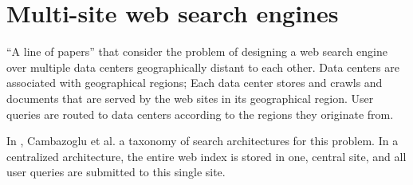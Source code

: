 



\section{Multi-site web search engines}
``A line of papers'' that consider the problem of designing a web search engine over multiple data centers geographically distant to each other.
Data centers are associated with geographical regions;
Each data center stores and crawls and documents that are served by the web sites in its geographical region.
User queries are routed to data centers according to the regions they originate from.


In \cite{yates:multisitefeasibility}, Cambazoglu et al. a taxonomy of search architectures for this problem.
In a centralized architecture, the entire web index is stored in one, central site,
and all user queries are submitted to this single site.




